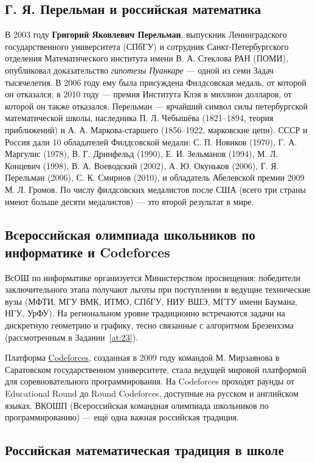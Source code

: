 \documentclass[12pt,a4paper]{scrartcl}
\newcommand{\acc}[1]{\textcolor{accent}{\textbf{#1}}}
\begin{document}
\subsection{Г. Я. Перельман и российская математика}

В 2003 году \acc{Григорий Яковлевич Перельман}, выпускник Ленинградского государственного университета (СПбГУ) и сотрудник Санкт-Петербургского отделения Математического института имени В. А. Стеклова РАН (ПОМИ), опубликовал доказательство \emph{гипотезы Пуанкаре} --- одной из семи Задач тысячелетия. В 2006 году ему была присуждена Филдсовская медаль, от которой он отказался; в 2010 году --- премия Института Клэя в миллион долларов, от которой он также отказался. Перельман --- ярчайший символ силы петербургской математической школы, наследника П. Л. Чебышёва (1821--1894, теория приближений) и А. А. Маркова-старшего (1856--1922, марковские цепи). СССР и Россия дали 10 обладателей Филдсовской медали: С. П. Новиков (1970), Г. А. Маргулис (1978), В. Г. Дринфельд (1990), Е. И. Зельманов (1994), М. Л. Концевич (1998), В. А. Воеводский (2002), А. Ю. Окуньков (2006), Г. Я. Перельман (2006), С. К. Смирнов (2010), и обладатель Абелевской премии 2009 М. Л. Громов. По числу филдсовских медалистов после США (всего три страны имеют больше десяти медалистов) --- это второй результат в мире.

\subsection{Всероссийская олимпиада школьников по информатике и Codeforces}

ВсОШ по информатике организуется Министерством просвещения; победители заключительного этапа получают льготы при поступлении в ведущие технические вузы (МФТИ, МГУ ВМК, ИТМО, СПбГУ, НИУ ВШЭ, МГТУ имени Баумана, НГУ, УрФУ). На региональном уровне традиционно встречаются задачи на дискретную геометрию и графику, тесно связанные с алгоритмом Брезенхэма (рассмотренным в Задании~\ref{at:23}).

Платформа \href{https://codeforces.com}{Codeforces}, созданная в 2009 году командой М. Мирзаянова в Саратовском государственном университете, стала ведущей мировой платформой для соревновательного программирования. На Codeforces проходят раунды от Educational Round до Round Codeforces, доступные на русском и английском языках. ВКОШП (Всероссийская командная олимпиада школьников по программированию) --- ещё одна важная российская традиция.

\subsection{Российская математическая традиция в школе}
\end{document}
